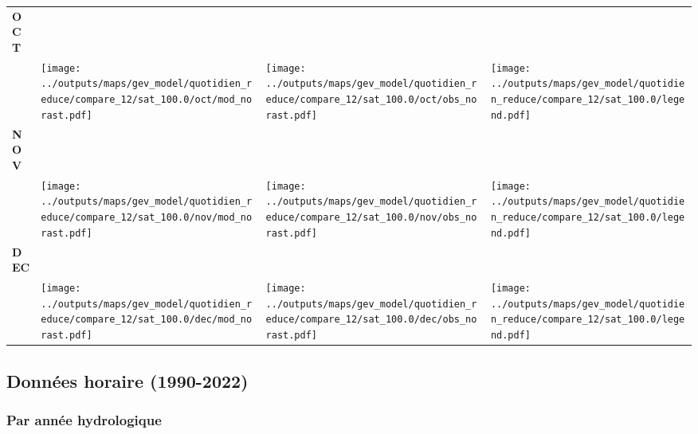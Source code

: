 \documentclass[
  letterpaper,
  DIV=11,
  numbers=noendperiod]{scrartcl}
\begin{document}
\begin{longtable*}{m{2.0cm}m{7.9cm}m{7.9cm}m{1cm}}
\centering \textbf{OCT} \\[0.2em] \begin{tabular}{r@{\hspace{0.2em}}l}\end{tabular} & \centering \texttt{[image: ../outputs/maps/gev\_model/quotidien\_reduce/compare\_12/sat\_100.0/oct/mod\_norast.pdf]} & \centering \texttt{[image: ../outputs/maps/gev\_model/quotidien\_reduce/compare\_12/sat\_100.0/oct/obs\_norast.pdf]} & \centering \texttt{[image: ../outputs/maps/gev\_model/quotidien\_reduce/compare\_12/sat\_100.0/legend.pdf]} \tabularnewline
\centering \textbf{NOV} \\[0.2em] \begin{tabular}{r@{\hspace{0.2em}}l}\end{tabular} & \centering \texttt{[image: ../outputs/maps/gev\_model/quotidien\_reduce/compare\_12/sat\_100.0/nov/mod\_norast.pdf]} & \centering \texttt{[image: ../outputs/maps/gev\_model/quotidien\_reduce/compare\_12/sat\_100.0/nov/obs\_norast.pdf]} & \centering \texttt{[image: ../outputs/maps/gev\_model/quotidien\_reduce/compare\_12/sat\_100.0/legend.pdf]} \tabularnewline
\centering \textbf{DEC} \\[0.2em] \begin{tabular}{r@{\hspace{0.2em}}l}\end{tabular} & \centering \texttt{[image: ../outputs/maps/gev\_model/quotidien\_reduce/compare\_12/sat\_100.0/dec/mod\_norast.pdf]} & \centering \texttt{[image: ../outputs/maps/gev\_model/quotidien\_reduce/compare\_12/sat\_100.0/dec/obs\_norast.pdf]} & \centering \texttt{[image: ../outputs/maps/gev\_model/quotidien\_reduce/compare\_12/sat\_100.0/legend.pdf]} \tabularnewline
\end{longtable*}

\subsection{Données horaire
(1990-2022)}\label{donnuxe9es-horaire-1990-2022-2}

\subsubsection{Par année
hydrologique}\label{par-annuxe9e-hydrologique-10}
\end{document}
